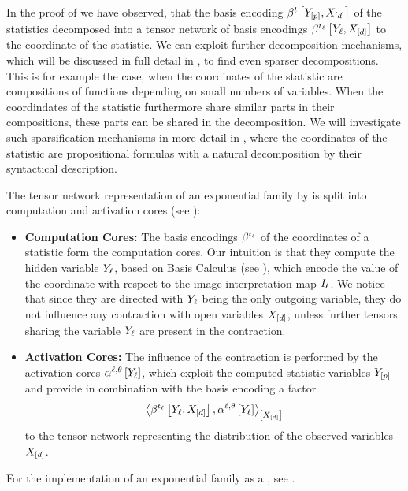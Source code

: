 In the proof of  we have observed, that the basis encoding $\bencodingofat{\sstat}{\headvariables,\shortcatvariables}$ of the statistics decomposed into a tensor network of basis encodings $\bencodingofat{\sstatcoordinateof{\selindex}}{\headvariableof{\selindex},\shortcatvariables}$ to the coordinate of the statistic.
We can exploit further decomposition mechanisms, which will be discussed in full detail in , to find even sparser decompositions.
This is for example the case, when the coordinates of the statistic are compositions of functions depending on small numbers of variables.
When the coordindates of the statistic furthermore share similar parts in their compositions, these parts can be shared in the decomposition.
We will investigate such sparsification mechanisms in more detail in , where the coordinates of the statistic are propositional formulas with a natural decomposition by their syntactical description.


The tensor network representation of an exponential family by  is split into computation and activation cores (see ):
\begin{itemize}
    \item \textbf{Computation Cores:} The basis encodings $\beta^{t_{\ell}}$ of the coordinates of a statistic form the computation cores.
    Our intuition is that they compute the hidden variable $Y_{\ell}$, based on Basis Calculus (see ), which encode the value of the coordinate with respect to the image interpretation map $I_{\ell}$.
    We notice that since they are directed with $Y_{\ell}$ being the only outgoing variable, they do not influence any contraction with open variables $X_{[d]}$, unless further tensors sharing the variable $Y_{\ell}$ are present in the contraction.
    \item \textbf{Activation Cores:} The influence of the contraction is performed by the activation cores $\alpha^{\ell,\theta}\left[Y_{\ell}\right]$, which exploit the computed statistic variables $Y_{[p]}$ and provide in combination with the basis encoding a factor
    \begin{align*}
        \contractionof{\bencodingofat{\sstatcoordinateof{\selindex}}{\headvariableof{\selindex},\shortcatvariables},\softactlegwith}{\shortcatvariables}
    \end{align*}
    to the tensor network representing the distribution of the observed variables $X_{[d]}$.
\end{itemize}
For the implementation of an exponential family as a \ComputationActivationNetwork{}, see . %

